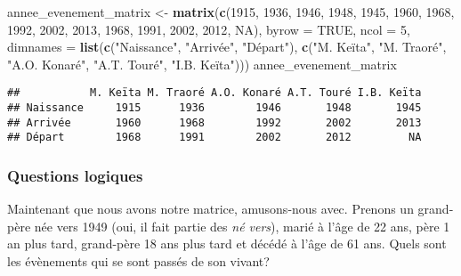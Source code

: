 \documentclass[]{book}
\newenvironment{Shaded}{\begin{snugshade}}{\end{snugshade}}
\newcommand{\KeywordTok}[1]{\textcolor[rgb]{0.13,0.29,0.53}{\textbf{#1}}}
\newcommand{\DataTypeTok}[1]{\textcolor[rgb]{0.13,0.29,0.53}{#1}}
\newcommand{\DecValTok}[1]{\textcolor[rgb]{0.00,0.00,0.81}{#1}}
\newcommand{\StringTok}[1]{\textcolor[rgb]{0.31,0.60,0.02}{#1}}
\newcommand{\OtherTok}[1]{\textcolor[rgb]{0.56,0.35,0.01}{#1}}
\newcommand{\NormalTok}[1]{#1}
\begin{document}
\begin{Shaded}
\begin{Highlighting}[]
\NormalTok{annee_evenement_matrix <-}\StringTok{ }\KeywordTok{matrix}\NormalTok{(}\KeywordTok{c}\NormalTok{(}\DecValTok{1915}\NormalTok{, }\DecValTok{1936}\NormalTok{, }\DecValTok{1946}\NormalTok{, }\DecValTok{1948}\NormalTok{, }\DecValTok{1945}\NormalTok{,}
                                   \DecValTok{1960}\NormalTok{, }\DecValTok{1968}\NormalTok{, }\DecValTok{1992}\NormalTok{, }\DecValTok{2002}\NormalTok{, }\DecValTok{2013}\NormalTok{,}
                                   \DecValTok{1968}\NormalTok{, }\DecValTok{1991}\NormalTok{, }\DecValTok{2002}\NormalTok{, }\DecValTok{2012}\NormalTok{, }\OtherTok{NA}\NormalTok{),}
                                 \DataTypeTok{byrow =} \OtherTok{TRUE}\NormalTok{,}
                                 \DataTypeTok{ncol =} \DecValTok{5}\NormalTok{,}
                                 \DataTypeTok{dimnames =} \KeywordTok{list}\NormalTok{(}\KeywordTok{c}\NormalTok{(}\StringTok{"Naissance"}\NormalTok{, }\StringTok{"Arrivée"}\NormalTok{, }\StringTok{"Départ"}\NormalTok{),}
                                                 \KeywordTok{c}\NormalTok{(}\StringTok{"M. Keïta"}\NormalTok{, }\StringTok{"M. Traoré"}\NormalTok{, }\StringTok{"A.O. Konaré"}\NormalTok{, }\StringTok{"A.T. Touré"}\NormalTok{, }\StringTok{"I.B. Keïta"}\NormalTok{)))}
\NormalTok{annee_evenement_matrix}
\end{Highlighting}
\end{Shaded}

\begin{verbatim}
##           M. Keïta M. Traoré A.O. Konaré A.T. Touré I.B. Keïta
## Naissance     1915      1936        1946       1948       1945
## Arrivée       1960      1968        1992       2002       2013
## Départ        1968      1991        2002       2012         NA
\end{verbatim}

\subsubsection{Questions logiques}\label{questions-logiques}

Maintenant que nous avons notre matrice, amusons-nous avec. Prenons un
grand-père née vers 1949 (oui, il fait partie des \emph{né vers}), marié
à l'âge de 22 ans, père 1 an plus tard, grand-père 18 ans plus tard et
décédé à l'âge de 61 ans. Quels sont les évènements qui se sont passés
de son vivant?
\end{document}
